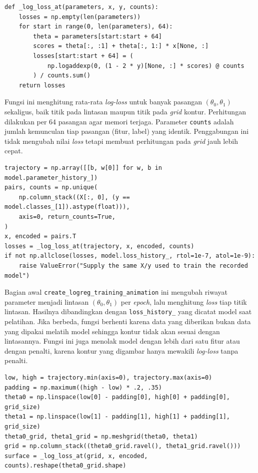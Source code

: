 \begin{lstlisting}
def _log_loss_at(parameters, x, y, counts):
    losses = np.empty(len(parameters))
    for start in range(0, len(parameters), 64):
        theta = parameters[start:start + 64]
        scores = theta[:, :1] + theta[:, 1:] * x[None, :]
        losses[start:start + 64] = (
            np.logaddexp(0, (1 - 2 * y)[None, :] * scores) @ counts
        ) / counts.sum()
    return losses
\end{lstlisting}

Fungsi ini menghitung rata-rata \textit{log-loss} untuk banyak pasangan
$(\theta_0,\theta_1)$ sekaligus, baik titik pada lintasan maupun titik pada
\textit{grid} kontur. Perhitungan dilakukan per 64 pasangan agar memori
terjaga. Parameter \texttt{counts} adalah jumlah kemunculan tiap pasangan
(fitur, label) yang identik. Penggabungan ini tidak mengubah nilai \textit{loss}
tetapi membuat perhitungan pada \textit{grid} jauh lebih cepat.

\begin{lstlisting}
trajectory = np.array([[b, w[0]] for w, b in model.parameter_history_])
pairs, counts = np.unique(
    np.column_stack((X[:, 0], (y == model.classes_[1]).astype(float))),
    axis=0, return_counts=True,
)
x, encoded = pairs.T
losses = _log_loss_at(trajectory, x, encoded, counts)
if not np.allclose(losses, model.loss_history_, rtol=1e-7, atol=1e-9):
    raise ValueError("Supply the same X/y used to train the recorded model")
\end{lstlisting}

Bagian awal \texttt{create\_logreg\_training\_animation} ini mengubah riwayat
parameter menjadi lintasan $(\theta_0,\theta_1)$ per \textit{epoch}, lalu
menghitung \textit{loss} tiap titik lintasan. Hasilnya dibandingkan dengan
\texttt{loss\_history\_} yang dicatat model saat pelatihan. Jika berbeda, fungsi
berhenti karena data yang diberikan bukan data yang dipakai melatih model
sehingga kontur tidak akan sesuai dengan lintasannya. Fungsi ini juga menolak
model dengan lebih dari satu fitur atau dengan penalti, karena kontur yang
digambar hanya mewakili \textit{log-loss} tanpa penalti.

\begin{lstlisting}
low, high = trajectory.min(axis=0), trajectory.max(axis=0)
padding = np.maximum((high - low) * .2, .35)
theta0 = np.linspace(low[0] - padding[0], high[0] + padding[0], grid_size)
theta1 = np.linspace(low[1] - padding[1], high[1] + padding[1], grid_size)
theta0_grid, theta1_grid = np.meshgrid(theta0, theta1)
grid = np.column_stack((theta0_grid.ravel(), theta1_grid.ravel()))
surface = _log_loss_at(grid, x, encoded, counts).reshape(theta0_grid.shape)
\end{lstlisting}

